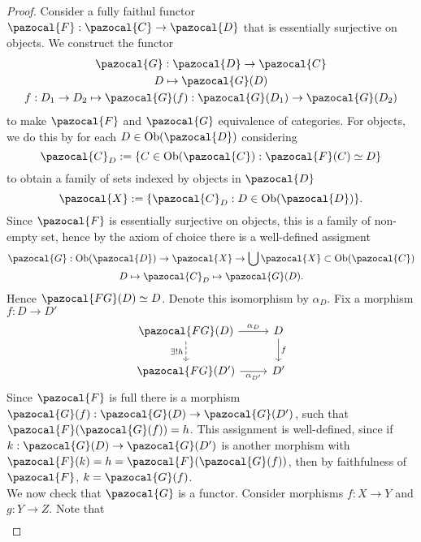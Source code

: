 \begin{proof}
        Consider a fully faithul functor $\pazocal{F} : \pazocal{C} \rightarrow \pazocal{D}$ that is essentially surjective on objects. We construct the functor 
        \begin{gather*}
            \pazocal{G} : \pazocal{D} \rightarrow \pazocal{C}\\ 
            D \mapsto \pazocal{G}(D)\\
            f : D_1 \rightarrow D_2 \mapsto \pazocal{G}(f) : \pazocal{G}(D_1) \rightarrow \pazocal{G}(D_2)
        \end{gather*}
       to make $\pazocal{F}$ and $\pazocal{G}$ equivalence of categories. For objects, we do this by for each $D\in \Ob(\pazocal{D})$ considering 
       $$
            \pazocal{C}_D := \{ C\in \Ob(\pazocal{C}) : \pazocal{F}(C)\simeq D\} 
       $$
       to obtain a family of sets indexed by objects in $\pazocal{D}$
       $$
            \pazocal{X} := \{ \pazocal{C}_D : D\in \Ob(\pazocal{D})\}.  
       $$
       Since $\pazocal{F}$ is essentially surjective on objects, this is a family of non-empty set, hence by the axiom of choice there is a well-defined assigment
       \begin{gather*}
            \pazocal{G}:\Ob(\pazocal{D}) \rightarrow \pazocal{X} \rightarrow \bigcup \pazocal{X}\subset \Ob(\pazocal{C})\\
            D \mapsto \pazocal{C}_D \mapsto \pazocal{G}(D).
       \end{gather*}
        Hence $\pazocal{FG}(D)\simeq D$. Denote this isomorphism by $\alpha_D$. Fix a morphism $f:D\rightarrow D'$ 
        $$
            \begin{tikzcd}
                \pazocal{FG}(D) \arrow[r,"\alpha_D"]\arrow[d,"\exists!h",dashed,swap] & D \arrow[d,"f"]\\
                \pazocal{FG}(D') \arrow[r,"\alpha_{D'}",swap] & D'
            \end{tikzcd}
        $$
        Since $\pazocal{F}$ is full there is a morphism $\pazocal{G}(f) : \pazocal{G}(D) \rightarrow \pazocal{G}(D')$, such that $\pazocal{F}(\pazocal{G}(f)) = h$. This assignment is well-defined, since if $k: \pazocal{G}(D)\rightarrow \pazocal{G}(D')$ is another morphism with $\pazocal{F}(k)= h = \pazocal{F}(\pazocal{G}(f))$, then by faithfulness of $\pazocal{F}$, $k = \pazocal{G}(f)$.\\
        We now check that $\pazocal{G}$ is a functor. Consider morphisms $f:X\rightarrow Y$ and $g:Y\rightarrow Z$. Note that 
        \begin{align*}

\end{align*}
\end{proof}

